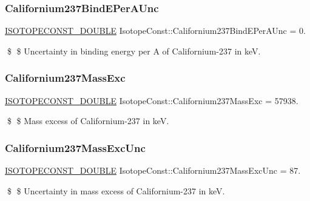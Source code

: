 \subsubsection{\texorpdfstring{Californium237\+Bind\+E\+Per\+A\+Unc}{Californium237BindEPerAUnc}}
{\footnotesize\ttfamily \mbox{\hyperlink{group___isotope_const-_macros_ga8f45a7272ce02c0b4c65c44636ed719a}{I\+S\+O\+T\+O\+P\+E\+C\+O\+N\+S\+T\+\_\+\+D\+O\+U\+B\+LE}} Isotope\+Const\+::\+Californium237\+Bind\+E\+Per\+A\+Unc = 0.}

\$ \$ Uncertainty in binding energy per A of Californium-\/237 in keV. \mbox{\label{group___isotope_const-_californium-_cf237_ga14f2e54787182329587b56990316d894}} 
\subsubsection{\texorpdfstring{Californium237\+Mass\+Exc}{Californium237MassExc}}
{\footnotesize\ttfamily \mbox{\hyperlink{group___isotope_const-_macros_ga8f45a7272ce02c0b4c65c44636ed719a}{I\+S\+O\+T\+O\+P\+E\+C\+O\+N\+S\+T\+\_\+\+D\+O\+U\+B\+LE}} Isotope\+Const\+::\+Californium237\+Mass\+Exc = 57938.}

\$ \$ Mass excess of Californium-\/237 in keV. \mbox{\label{group___isotope_const-_californium-_cf237_gadb0ea9d051037dd8f069ad0186697f26}} 
\subsubsection{\texorpdfstring{Californium237\+Mass\+Exc\+Unc}{Californium237MassExcUnc}}
{\footnotesize\ttfamily \mbox{\hyperlink{group___isotope_const-_macros_ga8f45a7272ce02c0b4c65c44636ed719a}{I\+S\+O\+T\+O\+P\+E\+C\+O\+N\+S\+T\+\_\+\+D\+O\+U\+B\+LE}} Isotope\+Const\+::\+Californium237\+Mass\+Exc\+Unc = 87.}

\$ \$ Uncertainty in mass excess of Californium-\/237 in keV. \mbox{\label{group___isotope_const-_californium-_cf237_ga589ccf17d25c791d905fd03cd65fc96f}} 
